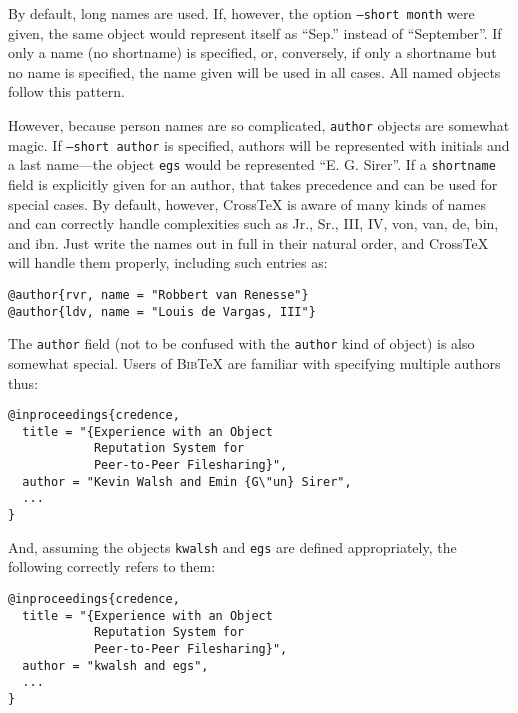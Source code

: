 \documentclass{article}
\newcommand{\XTeX}{Cross\TeX}
\newcommand{\BibTeX}{\textsc{Bib}\TeX}
\begin{document}
By default, long names are used. If, however, the option \texttt{--short month} were given, the same object would represent itself as ``Sep.'' instead of ``September''. If only a name (no shortname) is specified, or, conversely, if only a shortname but no name is specified, the name given will be used in all cases. All named objects follow this pattern.

However, because person names are so complicated, \texttt{author} objects are somewhat magic. If \texttt{--short author} is specified, authors will be represented with initials and a last name---the object \texttt{egs} would be represented ``E. G. Sirer''. If a \texttt{shortname} field is explicitly given for an author, that takes precedence and can be used for special cases. By default, however, \XTeX{} is aware of many kinds of names and can correctly handle complexities such as Jr., Sr., III, IV, von, van, de, bin, and ibn. Just write the names out in full in their natural order, and \XTeX{} will handle them properly, including such entries as:

\begin{small}\begin{verbatim}
@author{rvr, name = "Robbert van Renesse"}
@author{ldv, name = "Louis de Vargas, III"}
\end{verbatim}\end{small}

The \texttt{author} field (not to be confused with the \texttt{author} kind of object) is also somewhat special. Users of \BibTeX{} are familiar with specifying multiple authors thus:

\begin{small}\begin{verbatim}
@inproceedings{credence,
  title = "{Experience with an Object
            Reputation System for 
            Peer-to-Peer Filesharing}",
  author = "Kevin Walsh and Emin {G\"un} Sirer",
  ...
}
\end{verbatim}\end{small}

And, assuming the objects \texttt{kwalsh} and \texttt{egs} are defined appropriately, the following correctly refers to them:

\begin{small}\begin{verbatim}
@inproceedings{credence,
  title = "{Experience with an Object
            Reputation System for 
            Peer-to-Peer Filesharing}",
  author = "kwalsh and egs",
  ...
}
\end{verbatim}\end{small}
\end{document}
